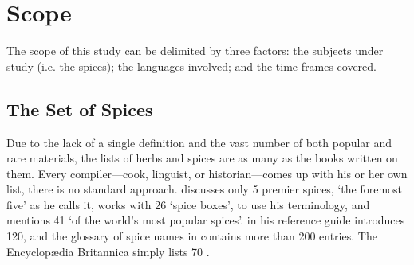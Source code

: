 


\section{Scope}

The scope of this study can be delimited by three factors: the subjects under study (i.e. the spices); the languages involved; and the time frames covered.

\subsection{The Set of Spices}

Due to the lack of a single definition and the vast number of both popular and rare materials, the lists of herbs and spices are as many as the books written on them. Every compiler---cook, linguist, or historian---comes up with his or her own list, there is no standard approach. \textcite{czarra_spices_2009} discusses only 5 premier spices, `the foremost five' as he calls it, \textcite{nabhan_cumin_2014} works with 26 `spice boxes', to use his terminology, and \textcite{rosengarten_book_1973} mentions 41 `of the world's most popular spices'. \textcite{van_wyk_culinary_2014} in his reference guide introduces 120, and the glossary of spice names in \textcite{dalby_dangerous_2000} contains more than 200 entries. The Encyclopædia Britannica simply lists 70 \autocite{petruzzello_list_nodate}. 

